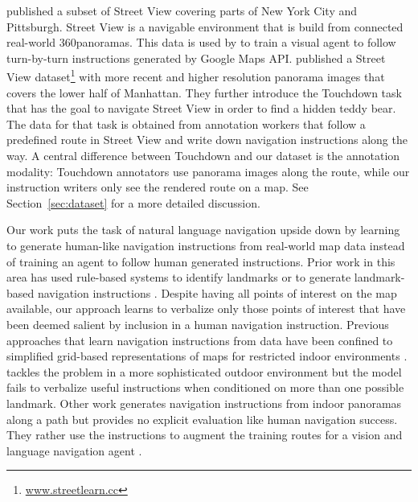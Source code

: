 \documentclass[11pt,a4paper]{article}
\begin{document}
\citet{mirowski-etal-2018-learning} published a subset of Street View covering parts of New York City and Pittsburgh. Street View is a navigable environment that is build from connected real-world 360\degree panoramas. This data is used by \citet{hermann-etal-2019-learning} to train a visual agent to follow turn-by-turn instructions generated by Google Maps API. 
\citet{chen-etal-2019-touchdown} published a Street View dataset\footnote{\url{www.streetlearn.cc}} with more recent and higher resolution panorama images that covers the lower half of Manhattan. They further introduce the Touchdown task that has the goal to navigate Street View in order to find a hidden teddy bear. The data for that task is obtained from annotation workers that follow a predefined route in Street View and write down navigation instructions along the way. 
A central difference between Touchdown and our dataset is the annotation modality: Touchdown annotators use  panorama images along the route, while our instruction writers only see the rendered route on a map. See Section~\ref{sec:dataset} for a more detailed discussion.

Our work puts the task of natural language navigation upside down by learning to generate human-like navigation instructions from real-world map data instead of training an agent to follow human generated instructions. Prior work in this area has used rule-based systems to identify landmarks \citep{rousell-zipf-2017-towards} or to generate landmark-based navigation instructions \citep{drager-koller-2012-generation,cercas-curry-etal-2015-generating}. Despite having all points of interest on the map available, our approach learns to verbalize only those points of interest that have been deemed salient by inclusion in a human navigation instruction. Previous approaches that learn navigation instructions from data have been confined to simplified grid-based representations of maps for restricted indoor environments \citep{daniele-etal-2017-navigational}.
\citet{devries-etal-2018-talk} tackles the problem in a more sophisticated outdoor environment but the model fails to verbalize useful instructions when conditioned on more than one possible landmark. Other work generates navigation instructions from indoor panoramas along a path but provides no explicit evaluation like human navigation success. They rather use the instructions to augment the training routes for a vision and language navigation agent \citep{NEURIPS2018_6a81681a}.
\end{document}
